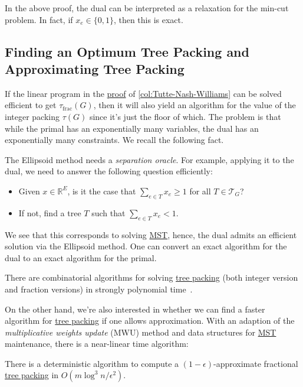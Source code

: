 \begin{remark}
	In the above proof, the dual can be interpreted as a relaxation for the min-cut problem. In fact, if \(x_e \in \{ 0, 1 \} \), then this is exact.
\end{remark}

\subsection{Finding an Optimum Tree Packing and Approximating Tree Packing}
If the linear program in the \hyperref[pf:col:Tutte-Nash-Williams]{proof} of \autoref{col:Tutte-Nash-Williams} can be solved efficient to get \(\tau _{\text{frac} }(G)\), then it will also yield an algorithm for the value of the integer packing \(\tau (G)\) since it's just the floor of which. The problem is that while the primal has an exponentially many variables, the dual has an exponentially many constraints. We recall the following fact.

\begin{prev}
	The Ellipsoid method needs a \emph{separation oracle}. For example, applying it to the dual, we need to answer the following question efficiently:
	\begin{itemize}
		\item Given \(x \in \mathbb{R} ^E\), is it the case that \(\sum_{e \in T} x_e \geq 1\) for all \(T \in \mathcal{T} _G\)?
		\item If not, find a tree \(T\) such that \(\sum_{e \in T} x_e < 1\).
	\end{itemize}
\end{prev}

We see that this corresponds to solving \hyperref[prb:MST]{MST}, hence, the dual admits an efficient solution via the Ellipsoid method. One can convert an exact algorithm for the dual to an exact algorithm for the primal.

\begin{remark}
	There are combinatorial algorithms for solving \hyperref[prb:TP]{tree packing} (both integer version and fraction versions) in strongly polynomial time~\cite{schrijver2003combinatorial}.
\end{remark}

On the other hand, we're also interested in whether we can find a faster algorithm for \hyperref[prb:TP]{tree packing} if one allows approximation. With an adaption of the \emph{multiplicative weights update} (MWU) method and data structures for \hyperref[prb:MST]{MST} maintenance, there is a near-linear time algorithm:

\begin{theorem}\label{thm:approximate-TP}
	There is a deterministic algorithm to compute a \((1 - \epsilon )\)-approximate fractional \hyperref[prb:TP]{tree packing} in \(O(m \log ^3 n / \epsilon ^2)\).
\end{theorem}